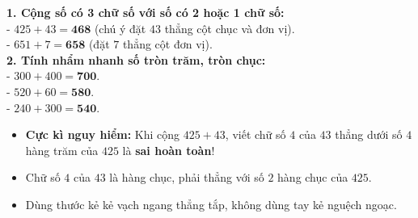\documentclass[10pt,a4paper]{article}
\begin{document}
\vspace{-1.5mm}
\noindent
\begin{minipage}[t]{0.49\textwidth}\vspace{0pt}
\begin{tcolorbox}[
  enhanced,
  colback=green!4!white,
  colframe=green!60!black,
  arc=2mm, boxrule=0.8pt,
  left=2mm, right=2mm, top=1.8mm, bottom=1.8mm,
  title={\footnotesize\bfseries\color{white}\faCheckCircle\ 4. Các dạng toán rèn luyện}
]
{\footnotesize
\textbf{1. Cộng số có 3 chữ số với số có 2 hoặc 1 chữ số:}\\
- $425 + 43 = \mathbf{468}$ (chú ý đặt $43$ thẳng cột chục và đơn vị).\\
- $651 + 7 = \mathbf{658}$ (đặt $7$ thẳng cột đơn vị).\\
\textbf{2. Tính nhẩm nhanh số tròn trăm, tròn chục:}\\
- $300 + 400 = \mathbf{700}$.\\
- $520 + 60 = \mathbf{580}$.\\
- $240 + 300 = \mathbf{540}$.
}
\end{tcolorbox}
\end{minipage}
\hfill
\begin{minipage}[t]{0.49\textwidth}\vspace{0pt}
\begin{tcolorbox}[
  enhanced,
  colback=rose!4!white,
  colframe=rose!70!black,
  arc=2mm, boxrule=0.8pt,
  left=2mm, right=2mm, top=1.8mm, bottom=1.8mm,
  title={\footnotesize\bfseries\color{white}\faExclamationTriangle\ 5. Lỗi đặt tính lệch cột nghiêm trọng}
]
{\footnotesize
\begin{itemize}\setlength{\itemsep}{1.5pt}\setlength{\leftskip}{-2.5mm}
  \item \textbf{Cực kì nguy hiểm:} Khi cộng $425 + 43$, viết chữ số $4$ của $43$ thẳng dưới số $4$ hàng trăm của $425$ là \textbf{sai hoàn toàn}!
  \item Chữ số $4$ của $43$ là hàng chục, phải thẳng với số $2$ hàng chục của $425$.
  \item Dùng thước kẻ kẻ vạch ngang thẳng tắp, không dùng tay kẻ nguệch ngoạc.
\end{itemize}
}
\end{tcolorbox}
\end{minipage}
\end{document}
